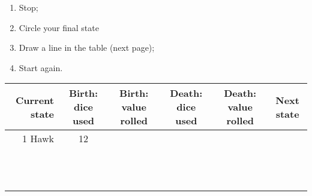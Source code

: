 \documentclass{article}
\begin{document}
\begin{enumerate}
    \item Stop;
    \item Circle your final state
    \item Draw a line in the table (next page);
    \item Start again.
\end{enumerate}

\newpage

\begin{center}
    \begin{tabular}{r|c|c|c|c|c}
        \toprule
        Current state & Birth: dice used & Birth: value rolled & Death: dice used & Death: value rolled & Next state   \\
        \midrule
        1 Hawk        & 12               &              &                  &              &              \\
                      &                  &              &                  &              &              \\
                      &                  &              &                  &              &              \\
                      &                  &              &                  &              &              \\
                      &                  &              &                  &              &              \\
                      &                  &              &                  &              &              \\
                      &                  &              &                  &              &              \\
                      &                  &              &                  &              &              \\
                      &                  &              &                  &              &              \\
                      &                  &              &                  &              &              \\
                      &                  &              &                  &              &              \\
                      &                  &              &                  &              &              \\
                      &                  &              &                  &              &              \\

\end{tabular}
\end{center}
\end{document}
